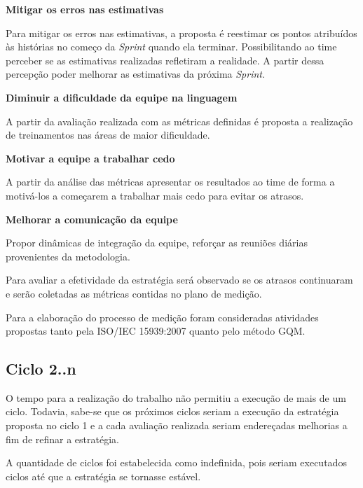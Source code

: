 			\textbf{Mitigar os erros nas estimativas}

				Para mitigar os erros nas estimativas, a proposta é reestimar os pontos atribuídos às histórias no começo da \textit{Sprint} quando ela terminar. Possibilitando ao time perceber se as estimativas realizadas refletiram a realidade. A partir dessa percepção poder melhorar as estimativas da próxima \textit{Sprint}.

			\textbf{Diminuir a dificuldade da equipe na linguagem}

				A partir da avaliação realizada com as métricas definidas é proposta a realização de treinamentos nas áreas de maior dificuldade.

			\textbf{Motivar a equipe a trabalhar cedo}

				A partir da análise das métricas apresentar os resultados ao time de forma a motivá-los a começarem a trabalhar mais cedo para evitar os atrasos.

			\textbf{Melhorar a comunicação da equipe}

				Propor dinâmicas de integração da equipe, reforçar as reuniões diárias provenientes da metodologia.



				Para avaliar a efetividade da estratégia será observado se os atrasos continuaram e serão coletadas as métricas contidas no plano
				de medição.


		
		 Para a elaboração do processo de medição foram consideradas atividades propostas tanto pela ISO/IEC 15939:2007 
		 quanto pelo método GQM.

		
		 



\subsection{Ciclo 2..n}

	O tempo para a realização do trabalho não permitiu a execução de mais de um ciclo. Todavia,
	sabe-se que os próximos ciclos seriam a execução da estratégia proposta no ciclo 1 e a cada avaliação realizada
	seriam endereçadas melhorias a fim de refinar a estratégia.

	A quantidade de ciclos foi estabelecida como indefinida, pois seriam executados ciclos até que a estratégia 
	se tornasse estável.

